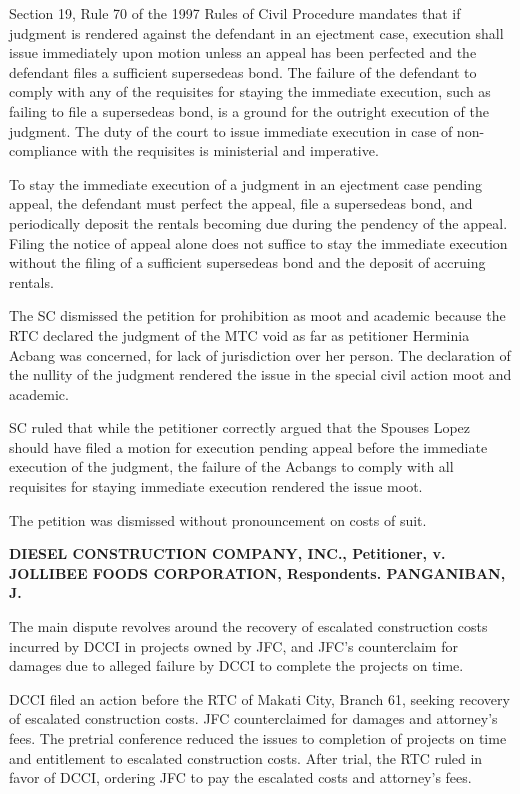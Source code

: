 \documentclass[
12pt,
oneside,
onehalfspacing,
headsepline
]{DigestCollection}
\begin{document}
Section 19, Rule 70 of the 1997 Rules of Civil Procedure mandates that if judgment is rendered against the defendant in an ejectment case, execution shall issue immediately upon motion unless an appeal has been perfected and the defendant files a sufficient supersedeas bond. The failure of the defendant to comply with any of the requisites for staying the immediate execution, such as failing to file a supersedeas bond, is a ground for the outright execution of the judgment. The duty of the court to issue immediate execution in case of non-compliance with the requisites is ministerial and imperative.

To stay the immediate execution of a judgment in an ejectment case pending appeal, the defendant must perfect the appeal, file a supersedeas bond, and periodically deposit the rentals becoming due during the pendency of the appeal. Filing the notice of appeal alone does not suffice to stay the immediate execution without the filing of a sufficient supersedeas bond and the deposit of accruing rentals.

The SC dismissed the petition for prohibition as moot and academic because the RTC declared the judgment of the MTC void as far as petitioner Herminia Acbang was concerned, for lack of jurisdiction over her person. The declaration of the nullity of the judgment rendered the issue in the special civil action moot and academic.

SC ruled that while the petitioner correctly argued that the Spouses Lopez should have filed a motion for execution pending appeal before the immediate execution of the judgment, the failure of the Acbangs to comply with all requisites for staying immediate execution rendered the issue moot. 

The petition was dismissed without pronouncement on costs of suit.

\label{e01f9100-0a19-11ef-932c-63c852f65e48}


\noindent\textbf{DIESEL CONSTRUCTION COMPANY, INC., Petitioner, v. \\JOLLIBEE FOODS CORPORATION, Respondents. PANGANIBAN, J.}\vspace{0.4cm}

The main dispute revolves around the recovery of escalated construction costs incurred by DCCI in projects owned by JFC, and JFC's counterclaim for damages due to alleged failure by DCCI to complete the projects on time.

DCCI filed an action before the RTC of Makati City, Branch 61, seeking recovery of escalated construction costs. JFC counterclaimed for damages and attorney's fees. The pretrial conference reduced the issues to completion of projects on time and entitlement to escalated construction costs. After trial, the RTC ruled in favor of DCCI, ordering JFC to pay the escalated costs and attorney's fees.
\end{document}
